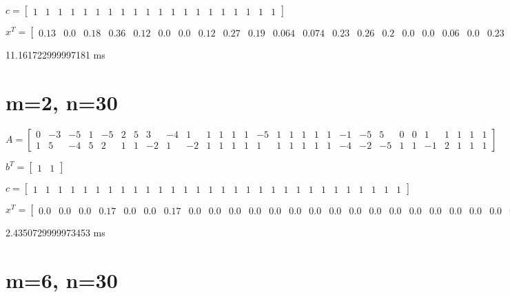 \documentclass[8pt]{article}
\begin{document}
$ c =
\begin{bmatrix}
  1  &  1  &  1  &  1  &  1  &  1  &  1  &  1  &  1  &  1  &  1  &  1  &  1  &  1  &  1  &  1  &  1  &  1  &  1  &  1 
\end{bmatrix}
$


$ x^T =
\begin{bmatrix}
  0.13 &  0.0 &  0.18 &  0.36 &  0.12 &  0.0 &  0.0 &  0.12 &  0.27 &  0.19 &  0.064 &  0.074 &  0.23 &  0.26 &  0.2 &  0.0 &  0.0 &  0.06 &  0.0 &  0.23
\end{bmatrix}
$


11.161722999997181  ms


\section{ m=2, n=30 }



\small
$ A =
\begin{bmatrix}
  0  & -3  & -5  &  1  & -5  &  2  &  5  &  3  & -4  &  1  &  1  &  1  &  1  &  1  & -5  &  1  &  1  &  1  &  1  &  1  & -1  & -5  &  5  &  0  &  0  &  1  &  1  &  1  &  1  &  1 \\
  1  &  5  & -4  &  5  &  2  &  1  &  1  & -2  &  1  & -2  &  1  &  1  &  1  &  1  &  1  &  1  &  1  &  1  &  1  &  1  & -4  & -2  & -5  &  1  &  1  & -1  &  2  &  1  &  1  &  1 
\end{bmatrix}
$


\small
$ b^T =
\begin{bmatrix}
  1  &  1 
\end{bmatrix}
$


\small
$ c =
\begin{bmatrix}
  1  &  1  &  1  &  1  &  1  &  1  &  1  &  1  &  1  &  1  &  1  &  1  &  1  &  1  &  1  &  1  &  1  &  1  &  1  &  1  &  1  &  1  &  1  &  1  &  1  &  1  &  1  &  1  &  1  &  1 
\end{bmatrix}
$


\small
$ x^T =
\begin{bmatrix}
  0.0 &  0.0 &  0.0 &  0.17 &  0.0 &  0.0 &  0.17 &  0.0 &  0.0 &  0.0 &  0.0 &  0.0 &  0.0 &  0.0 &  0.0 &  0.0 &  0.0 &  0.0 &  0.0 &  0.0 &  0.0 &  0.0 &  0.0 &  0.0 &  0.0 &  0.0 &  0.0 &  0.0 &  0.0 &  0.0
\end{bmatrix}
$


2.4350729999973453  ms


\section{ m=6, n=30 }
\end{document}
